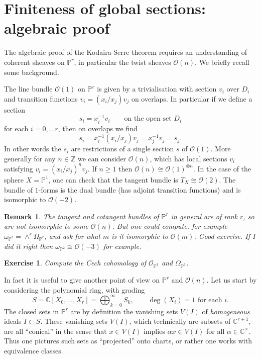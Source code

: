 \documentclass[12pt]{article}
\theoremstyle{plain}
\newtheorem{rem}[thm]{Remark}
\newtheorem{exer}[thm]{Exercise}
\theoremstyle{definition}
\numberwithin{equation}{section}
\newcommand{\al}{\alpha}
\newcommand{\Om}{\Omega}
\newcommand{\C}{\mathbb{C}}
\newcommand{\Z}{\mathbb{Z}}
\newcommand{\bbP}{\mathbb{P}}
\newcommand{\OO}{\mathcal{O}}
\begin{document}
\section{Finiteness of global sections: algebraic proof}


The algebraic proof of the Kodaira-Serre theorem requires an understanding of coherent sheaves on $\bbP^r$, in particular the twist sheaves $\OO(n)$. We briefly recall some background.

The line bundle $\OO(1)$ on $\bbP^r$ is given by a trivialisation with section $v_i$ over $D_i$ and transition functions $v_i = (x_i/x_j) v_j$ on overlaps. In particular if we define a section
\[
s_i = x_i^{-1} v_i \qquad \text{on the open set $D_i$}
\]
for each $i = 0, \ldots r$, then on overlaps we find
\[
s_i = x_i^{-1} (x_i/x_j) v_j = x_j^{-1} v_j = s_j.
\]
In other words the $s_i$ are restrictions of a single section $s$ of $\OO(1)$. More generally for any $n \in \Z$ we can consider $\OO(n)$, which has local sections $v_i$ satisfying $v_i = (x_i/x_j)^n v_j$. If $n \geq 1$ then $\OO(n) \cong \OO(1)^{\otimes n}$. In the case of the sphere $X = \bbP^1$, one can check that the tangent bundle is $T_X \cong \OO(2)$. The bundle of $1$-forms is the dual bundle (has adjoint transition functions) and is isomorphic to $\OO(-2)$.
\begin{rem}
The tangent and cotangent bundles of $\bbP^r$ in general are of rank $r$, so are not isomorphic to some $\OO(n)$. But one could compute, for example $\omega_{\bbP^r} = \wedge^r \Om_{\bbP^r}$, and ask for what $m$ is it isomorphic to $\OO(m)$. Good exercise. If I did it right then $\omega_{\bbP^2} \cong \OO(-3)$ for example.
\end{rem}

\begin{exer}
Compute the Cech cohomology of $\OO_{\bbP^1}$ and $\Omega_{\bbP^1}$.
\end{exer}

In fact it is useful to give another point of view on $\bbP^r$ and $\OO(n)$. Let us start by considering the polynomial ring, with grading
\[
S = \C[X_0, \ldots, X_r] = \bigoplus_{k=0}^\infty S_k, \qquad \text{$\deg(X_i) = 1$ for each $i$}.
\]
The closed sets in $\bbP^r$ are by definition the vanishing sets $V(I)$ of \emph{homogeneous} ideals $I \subset S$. These vanishing sets $V(I)$, which technically are subsets of $\C^{r+1}$, are all ``conical'' in the sense that $x \in V(I)$ implies $\alpha x \in V(I)$ for all $\al \in \C^{\times}$. Thus one pictures such sets as ``projected'' onto charts, or rather one works with equivalence classes.
\end{document}
